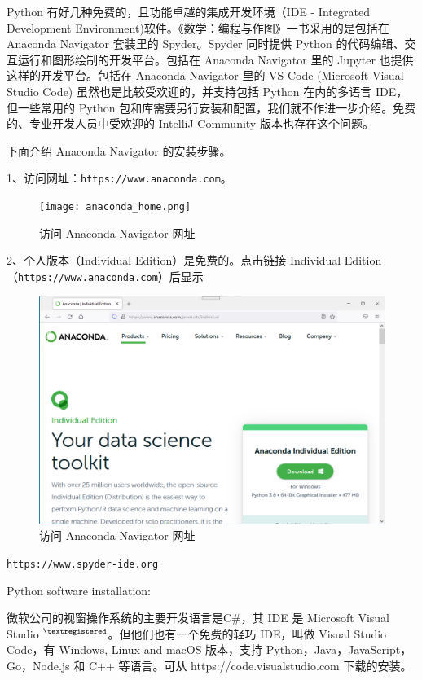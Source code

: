 \documentclass[main.tex]{subfiles}
\begin{document}
	
Python 有好几种免费的，且功能卓越的集成开发环境（IDE - Integrated Development Environment)软件。《数学：编程与作图》一书采用的是包括在
Anaconda Navigator  套装里的 Spyder。Spyder 同时提供 Python 的代码编辑、交互运行和图形绘制的开发平台。包括在 Anaconda Navigator 里的 Jupyter 也提供这样的开发平台。包括在 Anaconda Navigator 里的 VS Code (Microsoft Visual Studio Code) 虽然也是比较受欢迎的，并支持包括 Python 在内的多语言 IDE，但一些常用的 Python 包和库需要另行安装和配置，我们就不作进一步介绍。免费的、专业开发人员中受欢迎的 IntelliJ Community 版本也存在这个问题。

下面介绍 Anaconda Navigator 的安装步骤。

1、访问网址：\verb|https://www.anaconda.com|。

\begin{figure}[h]
	\centering
	\texttt{[image: anaconda\_home.png]}
	\caption{访问 Anaconda Navigator 网址}
	\label{fig:1.1}
\end{figure}

2、个人版本（Individual Edition）是免费的。点击链接 Individual Edition （\verb|https://www.anaconda.com|）后显示

\begin{figure}[h]
	\centering
	\includegraphics[width=1.0\textwidth]{anaconda_download.png}
	\caption{访问 Anaconda Navigator 网址}
	\label{fig:1.1}
\end{figure}


\verb|https://www.spyder-ide.org|

Python software installation:



微软公司的视窗操作系统的主要开发语言是C\#，其 IDE 是 Microsoft Visual Studio ${}^{\textregistered}$。但他们也有一个免费的轻巧 IDE，叫做 Visual Studio Code，有 Windows, Linux and macOS 版本，支持 Python，Java，JavaScript，Go，Node.js 和 C++ 等语言。可从
https://code.visualstudio.com
下载的安装。
\end{document}

